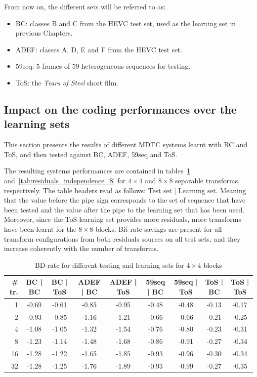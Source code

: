 \documentclass[11pt,a4paper,openright,twoside]{book}
\numberwithin{equation}{section} %
\numberwithin{figure}{section} %
\numberwithin{table}{section} %
\begin{document}
From now on, the different sets will be referred to as:
\begin{itemize}
	\item BC: classes B and C from the \ac{HEVC} test set, used as the
		learning set in previous Chapters.
	\item ADEF: classes A, D, E and F from the \ac{HEVC} test set.
	\item 59seq: 5 frames of 59 heterogeneous sequences for testing.
	\item ToS: the \emph{Tears of Steel} short film.
\end{itemize}

\subsection{Impact on the coding performances over the learning sets}
\label{sub:rw_performances_new_data_set}

This section presents the results of different \ac{MDTC} systems learnt with
BC and ToS, and then tested against BC, ADEF, 59seq and ToS.

The resulting systems performances are contained in
tables~\ref{tab:residuals_independence_4}
and~\ref{tab:residuals_independence_8} for $4\times4$ and $8\times8$ separable
transforms, respectively.
The table headers read as follows: Test set | Learning set.
Meaning that the value before the pipe sign corresponds to the set of sequence that
have been tested and the value after the pipe to the learning set that has
been used.
Moreover, since the ToS learning set provides more residuals, more transforms
have been learnt for the $8\times8$ blocks.
Bit-rate savings are present for all transform configurations from both
residuals sources on all test sets, and they increase coherently with the
number of transforms.

\begin{table}[tb]
	\centering
	\small
	\begin{tabularx}{\linewidth}{r|cc|cc|cc|cc}
		\# tr. & BC | BC & BC | ToS & ADEF | BC & ADEF | ToS & 59seq | BC &
		59seq | ToS & ToS | BC & ToS | ToS \\
		\hline\hline
		1  & -0.69 & -0.61 & -0.85 & -0.95 & -0.48 & -0.48 & -0.13 & -0.17 \\
		2  & -0.93 & -0.85 & -1.16 & -1.21 & -0.66 & -0.66 & -0.21 & -0.25 \\
		4  & -1.08 & -1.05 & -1.32 & -1.54 & -0.76 & -0.80 & -0.23 & -0.31 \\
		8  & -1.23 & -1.14 & -1.48 & -1.68 & -0.86 & -0.91 & -0.27 & -0.34 \\
		16 & -1.28 & -1.22 & -1.65 & -1.85 & -0.93 & -0.96 & -0.30 & -0.34 \\
		32 & -1.28 & -1.25 & -1.76 & -1.89 & -0.93 & -0.99 & -0.27 & -0.35 \\
	\end{tabularx}
	\caption{\acs{BD}-rate for different testing and learning sets for
	$4\times4$ blocks}
	\label{tab:residuals_independence_4}
\end{table}
\end{document}
